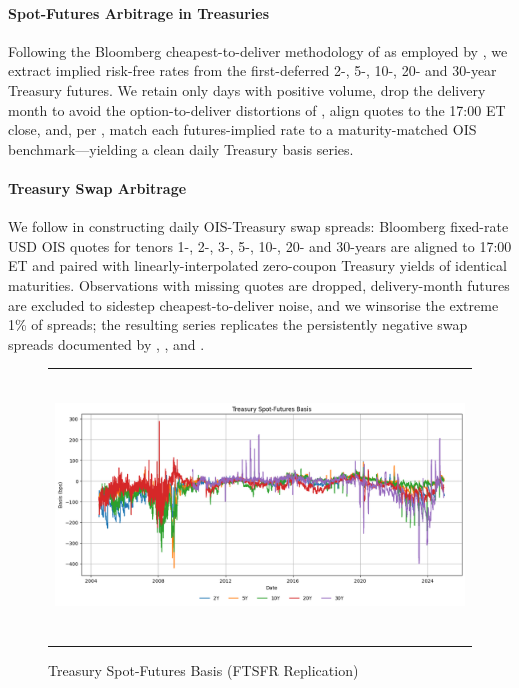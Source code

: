 \documentclass{article}
\begin{document}

\paragraph{Spot-Futures Arbitrage in Treasuries}
Following the Bloomberg cheapest-to-deliver methodology of \citet{Fleckenstein2020} as employed by \citet{Siriwardane2021}, we extract implied risk-free rates from the first-deferred 2-, 5-, 10-, 20- and 30-year Treasury futures.  We retain only days with positive volume, drop the delivery month to avoid the option-to-deliver distortions of \citet{Burghardt2005}, align quotes to the 17:00 ET close, and, per \citet{Barth2021}, match each futures-implied rate to a maturity-matched OIS benchmark—yielding a clean daily Treasury basis series.

\paragraph{Treasury Swap Arbitrage}
We follow \citet{Siriwardane2021} in constructing daily OIS-Treasury swap
spreads: Bloomberg fixed-rate USD OIS quotes for tenors 1-, 2-, 3-, 5-, 10-, 20-
and 30-years are aligned to 17:00 ET and paired with linearly-interpolated
zero-coupon Treasury yields of identical maturities.  Observations with missing
quotes are dropped, delivery-month futures are excluded to sidestep
cheapest-to-deliver noise, and we winsorise the extreme 1\% of spreads; the
resulting series replicates the persistently negative swap spreads documented by
\citet{Jermann2020}, \citet{Du2023}, and \citet{Hanson2023}.

\begin{figure}[h!]
  \centering
  \begin{tabular}{@{}c@{}}
    \includegraphics[width=.7\linewidth,height=200pt,width=400pt]{../docs_src/treasury_spot_futures_arbitrage.png}
  \end{tabular}
  \caption{Treasury Spot-Futures Basis (FTSFR Replication)}
  \label{fig:treasury_sf_basis}
\end{figure}
\end{document}
